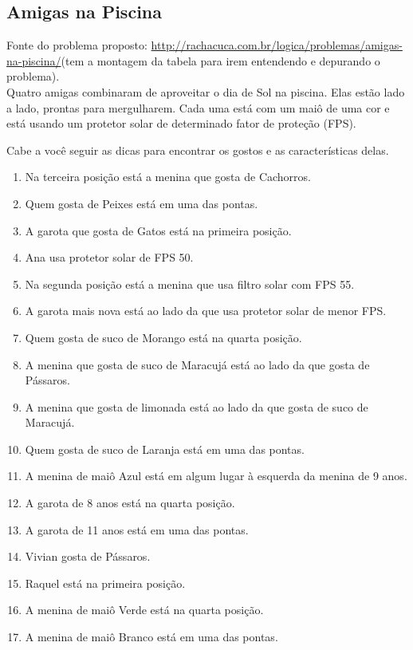\documentclass[final,a4paper]{article}
\begin{document}
\subsection{Amigas na Piscina}

 Fonte do problema proposto:   \url{http://rachacuca.com.br/logica/problemas/amigas-na-piscina/}(tem a montagem da tabela para irem entendendo e depurando o problema).\\

Quatro amigas combinaram de aproveitar o dia de Sol na piscina. Elas estão lado a lado, prontas para mergulharem. Cada uma está com um maiô de uma cor e está usando um protetor solar de determinado fator de proteção (FPS).

Cabe a você seguir as dicas para encontrar os gostos e as características delas.

\begin{enumerate}
  \item     Na terceira posição está a menina que gosta de Cachorros.
  \item     Quem gosta de Peixes está em uma das pontas.
  \item     A garota que gosta de Gatos está na primeira posição.
  \item     Ana usa protetor solar de FPS 50.
  \item     Na segunda posição está a menina que usa filtro solar com FPS 55.
  \item     A garota mais nova está ao lado da que usa protetor solar de menor FPS.
  \item    Quem gosta de suco de Morango está na quarta posição.
  \item     A menina que gosta de suco de Maracujá está ao lado da que gosta de Pássaros.
  \item     A menina que gosta de limonada está ao lado da que gosta de suco de Maracujá.
  
  \item   Quem gosta de suco de Laranja está em uma das pontas.
  \item     A menina de maiô Azul está em algum lugar à esquerda da menina de 9 anos.
  \item     A garota de 8 anos está na quarta posição.
  \item     A garota de 11 anos está em uma das pontas.
  \item     Vivian gosta de Pássaros.
  \item     Raquel está na primeira posição.
  \item     A menina de maiô Verde está na quarta posição.
  \item     A menina de maiô Branco está em uma das pontas.
    
\end{enumerate}
\end{document}
